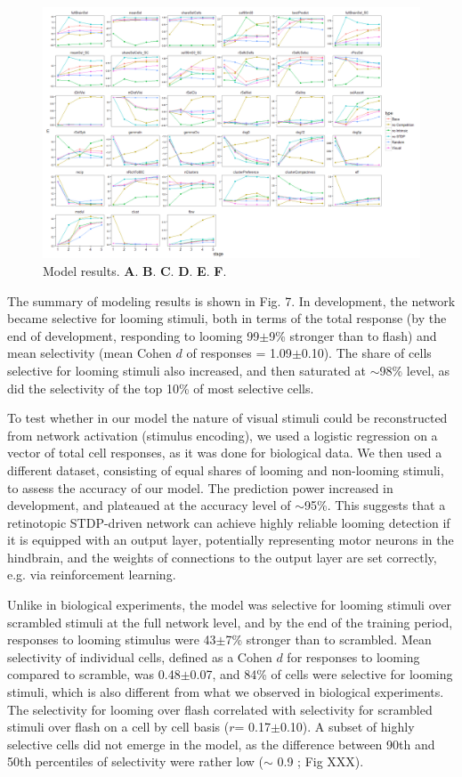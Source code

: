 \documentclass{article}
\begin{document}
\begin{figure}[t!]
\includegraphics[width=\linewidth]{fig7.png}
\caption{
Model results. \textbf{A}. \textbf{B}. \textbf{C}. \textbf{D}. \textbf{E}. \textbf{F}. }
\end{figure}

The summary of modeling results is shown in Fig. 7. In development, the network became selective for looming stimuli, both in terms of the total response (by the end of development, responding to looming 99$\pm$9\% stronger than to flash) and mean selectivity (mean Cohen $d$ of responses = 1.09$\pm$0.10). The share of cells selective for looming stimuli also increased, and then saturated at $\sim$98\% level, as did the selectivity of the top 10\% of most selective cells.

To test whether in our model the nature of visual stimuli could be reconstructed from network activation (stimulus encoding), we used a logistic regression on a vector of total cell responses, as it was done for biological data. We then used a different dataset, consisting of equal shares of looming and non-looming stimuli, to assess the accuracy of our model. The prediction power increased in development, and plateaued at the accuracy level of $\sim$95\%. This suggests that a retinotopic STDP-driven network can achieve highly reliable looming detection if it is equipped with an output layer, potentially representing motor neurons in the hindbrain, and the weights of connections to the output layer are set correctly, e.g. via reinforcement learning.

Unlike in biological experiments, the model was selective for looming stimuli over scrambled stimuli at the full network level, and by the end of the training period, responses to looming stimulus were 43$\pm$7\% stronger than to scrambled. Mean selectivity of individual cells, defined as a Cohen $d$ for responses to looming compared to scramble, was 0.48$\pm$0.07, and 84\% of cells were selective for looming stimuli, which is also different from what we observed in biological experiments. The selectivity for looming over flash correlated with selectivity for scrambled stimuli over flash on a cell by cell basis ($r$= 0.17$\pm$0.10). A subset of highly selective cells did not emerge in the model, as the difference between 90th and 50th percentiles of selectivity were rather low ($\sim$ 0.9 ; Fig XXX).
\end{document}
